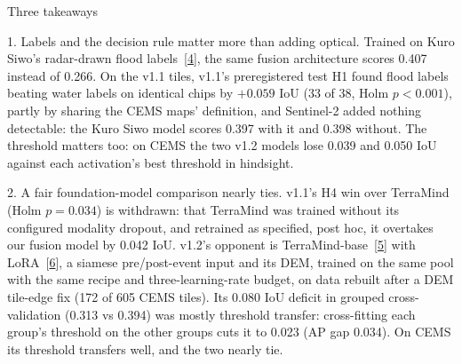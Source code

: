 \documentclass[10pt,twocolumn,a4paper]{article}
\makeatletter
\newcommand{\refn}[2]{\hyperref[ref:#1]{#2}}
\renewcommand\section{\@startsection{section}{1}{\z@}{-1.1ex \@plus -.3ex \@minus -.2ex}{0.5ex \@plus .2ex}%
  {\normalfont\large\bfseries}}
\renewcommand\paragraph{\@startsection{paragraph}{4}{\z@}{0.9ex \@plus .4ex \@minus .2ex}{-1em}%
  {\normalfont\normalsize\bfseries}}
\makeatother
\begin{document}
\section{Three takeaways}\label{sec:takeaways}

\paragraph{1. Labels and the decision rule matter more than adding optical.}
Trained on Kuro Siwo's radar-drawn flood labels~[\refn{bountos2024kurosiwo}{4}], the same fusion architecture scores 0.407
instead of 0.266. On the v1.1 tiles, v1.1's preregistered test H1 found flood labels beating water labels on identical
chips by $+0.059$ IoU (33 of 38, Holm $p<0.001$), partly by sharing the CEMS maps' definition, and Sentinel-2 added
nothing detectable: the Kuro Siwo model scores 0.397 with it and 0.398 without. The threshold matters too: on CEMS the
two v1.2 models lose 0.039 and 0.050 IoU against each activation's best threshold in hindsight.

\paragraph{2. A fair foundation-model comparison nearly ties.}
v1.1's H4 win over TerraMind (Holm $p=0.034$) is withdrawn: that TerraMind was trained without its configured
modality dropout, and retrained as specified, post hoc, it overtakes our fusion model by 0.042 IoU. v1.2's opponent is
TerraMind-base~[\refn{jakubik2025terramind}{5}] with LoRA~[\refn{hu2021lora}{6}], a siamese pre/post-event input and its DEM,
trained on the same pool with the same recipe and three-learning-rate budget, on data rebuilt after a DEM tile-edge
fix (172 of 605 CEMS tiles). Its 0.080 IoU deficit in grouped cross-validation (0.313 vs 0.394) was mostly threshold
transfer: cross-fitting each group's threshold on the other groups cuts it to 0.023 (AP gap 0.034). On CEMS its
threshold transfers well, and the two nearly tie.
\end{document}
